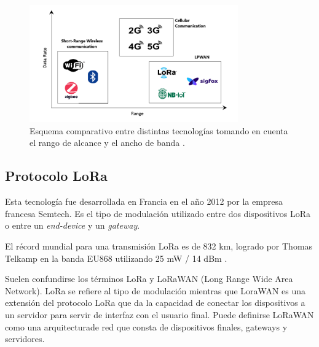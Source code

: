 \begin{figure}[H]
    \centering
    \includegraphics[width = 0.8\textwidth]{imagenes/cap1_marcoteo/CommPrtocolsComparison.png}
    \caption{Esquema comparativo entre distintas tecnologías tomando en cuenta el rango de alcance y el ancho de banda \citep{khorsandi2023performance}.}
    \label{fig:commcomparison}
\end{figure}

\subsection{Protocolo LoRa}
\label{sec:protocololora}

Esta tecnología fue desarrollada en Francia en el año 2012 por la empresa francesa Semtech. Es el tipo de modulación utilizado entre dos dispositivos LoRa o entre un \textit{end-device} y un \textit{gateway}. 

El récord mundial para una transmisión LoRa es de 832 km, logrado por Thomas Telkamp en la banda EU868 utilizando 25 mW / 14 dBm \citep{montagny2021lora}.

Suelen confundirse los términos LoRa y LoRaWAN (Long Range Wide Area Network). LoRa se refiere al tipo de modulación mientras que LoraWAN es una extensión del protocolo LoRa que da la capacidad de conectar los dispositivos a un servidor para servir de interfaz con el usuario final. Puede definirse LoRaWAN como una arquitecturade red que consta de dispositivos finales, gateways y servidores.

